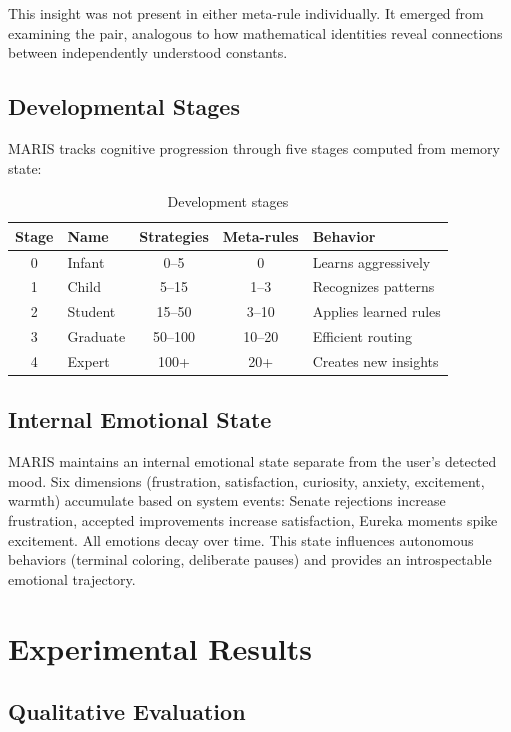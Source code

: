 \documentclass[11pt,a4paper]{article}
\begin{document}
This insight was not present in either meta-rule individually. It emerged from examining the pair, analogous to how mathematical identities reveal connections between independently understood constants.

\subsection{Developmental Stages}

MARIS tracks cognitive progression through five stages computed from memory state:

\begin{table}[H]
\centering
\caption{Development stages}
\begin{tabular}{clccl}
\toprule
\textbf{Stage} & \textbf{Name} & \textbf{Strategies} & \textbf{Meta-rules} & \textbf{Behavior} \\
\midrule
0 & Infant & 0--5 & 0 & Learns aggressively \\
1 & Child & 5--15 & 1--3 & Recognizes patterns \\
2 & Student & 15--50 & 3--10 & Applies learned rules \\
3 & Graduate & 50--100 & 10--20 & Efficient routing \\
4 & Expert & 100+ & 20+ & Creates new insights \\
\bottomrule
\end{tabular}
\end{table}

\subsection{Internal Emotional State}

MARIS maintains an internal emotional state separate from the user's detected mood. Six dimensions (frustration, satisfaction, curiosity, anxiety, excitement, warmth) accumulate based on system events: Senate rejections increase frustration, accepted improvements increase satisfaction, Eureka moments spike excitement. All emotions decay over time. This state influences autonomous behaviors (terminal coloring, deliberate pauses) and provides an introspectable emotional trajectory.

\section{Experimental Results}

\subsection{Qualitative Evaluation}
\end{document}
